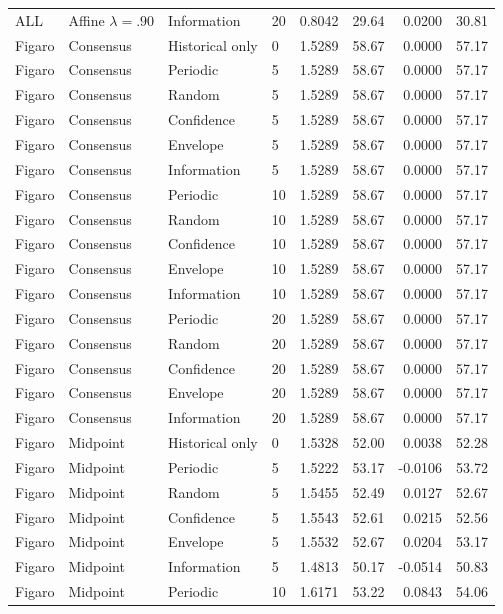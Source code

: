 \begin{longtable}{llllrrrr}
ALL & Affine $\lambda=.90$ & Information & 20 & 0.8042 & 29.64 & 0.0200 & 30.81 \\
Figaro & Consensus & Historical only & 0 & 1.5289 & 58.67 & 0.0000 & 57.17 \\
Figaro & Consensus & Periodic & 5 & 1.5289 & 58.67 & 0.0000 & 57.17 \\
Figaro & Consensus & Random & 5 & 1.5289 & 58.67 & 0.0000 & 57.17 \\
Figaro & Consensus & Confidence & 5 & 1.5289 & 58.67 & 0.0000 & 57.17 \\
Figaro & Consensus & Envelope & 5 & 1.5289 & 58.67 & 0.0000 & 57.17 \\
Figaro & Consensus & Information & 5 & 1.5289 & 58.67 & 0.0000 & 57.17 \\
Figaro & Consensus & Periodic & 10 & 1.5289 & 58.67 & 0.0000 & 57.17 \\
Figaro & Consensus & Random & 10 & 1.5289 & 58.67 & 0.0000 & 57.17 \\
Figaro & Consensus & Confidence & 10 & 1.5289 & 58.67 & 0.0000 & 57.17 \\
Figaro & Consensus & Envelope & 10 & 1.5289 & 58.67 & 0.0000 & 57.17 \\
Figaro & Consensus & Information & 10 & 1.5289 & 58.67 & 0.0000 & 57.17 \\
Figaro & Consensus & Periodic & 20 & 1.5289 & 58.67 & 0.0000 & 57.17 \\
Figaro & Consensus & Random & 20 & 1.5289 & 58.67 & 0.0000 & 57.17 \\
Figaro & Consensus & Confidence & 20 & 1.5289 & 58.67 & 0.0000 & 57.17 \\
Figaro & Consensus & Envelope & 20 & 1.5289 & 58.67 & 0.0000 & 57.17 \\
Figaro & Consensus & Information & 20 & 1.5289 & 58.67 & 0.0000 & 57.17 \\
Figaro & Midpoint & Historical only & 0 & 1.5328 & 52.00 & 0.0038 & 52.28 \\
Figaro & Midpoint & Periodic & 5 & 1.5222 & 53.17 & -0.0106 & 53.72 \\
Figaro & Midpoint & Random & 5 & 1.5455 & 52.49 & 0.0127 & 52.67 \\
Figaro & Midpoint & Confidence & 5 & 1.5543 & 52.61 & 0.0215 & 52.56 \\
Figaro & Midpoint & Envelope & 5 & 1.5532 & 52.67 & 0.0204 & 53.17 \\
Figaro & Midpoint & Information & 5 & 1.4813 & 50.17 & -0.0514 & 50.83 \\
Figaro & Midpoint & Periodic & 10 & 1.6171 & 53.22 & 0.0843 & 54.06 \\

\end{longtable}
